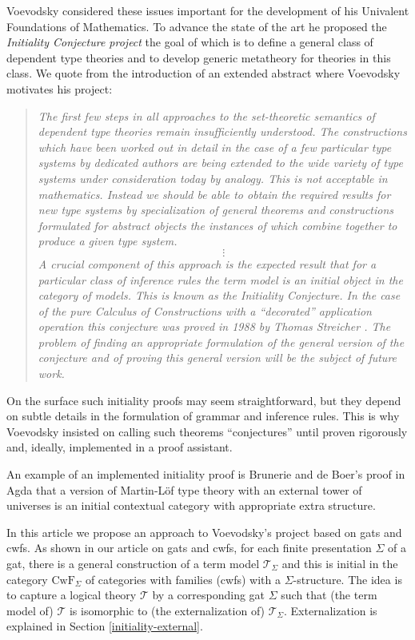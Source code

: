 \documentclass[submission,copyright,creativecommons]{eptcs}
\newcommand{\T}{\mathsf{T}}
\def\T{\mathcal{T}}
\def\CwF{\mathrm{CwF}}
\begin{document}
Voevodsky considered these issues important for the development of his Univalent Foundations of Mathematics. To advance the state
of the art he proposed the {\em Initiality Conjecture project} the goal of which is to define a general class of dependent type theories and to develop generic metatheory for theories in this class. We quote from the introduction of an extended abstract where Voevodsky \cite{voevodsky:initiality} motivates his project:
\begin{quotation}
\emph{The first few steps in all approaches to the set-theoretic semantics of dependent
type theories remain insuﬃciently understood. The constructions which have been
worked out in detail in the case of a few particular type systems by dedicated authors
are being extended to the wide variety of type systems under consideration today by
analogy. This is not acceptable in mathematics. Instead we should be able to obtain
the required results for new type systems by specialization of general theorems and
constructions formulated for abstract objects the instances of which combine together
to produce a given type system.}
$$
\vdots
$$
\emph{A crucial component of this approach is the expected result that for a particular
class of inference rules the term model is an initial object in the category of models.
This is known as the Initiality Conjecture. In the case of the pure Calculus of
Constructions with a “decorated” application operation this conjecture was proved in
1988 by Thomas Streicher \cite{streicher:thesis}. The problem of finding an appropriate formulation
of the general version of the conjecture and of proving this general version will be the
subject of future work.}
\end{quotation}
On the surface such initiality proofs may seem straightforward, but they depend on subtle details in the formulation of grammar and inference rules. This is why Voevodsky insisted on calling such theorems ``conjectures'' until proven rigorously and, ideally, implemented in a proof assistant.

An example of an implemented initiality proof is Brunerie and de Boer's \cite{Brunerie:initiality,deBoer:lic} proof in Agda that a version of Martin-Löf type theory with an external tower of universes is an initial contextual category \cite{cartmell:phd,cartmell:apal} with appropriate extra structure. %

In this article we propose an approach to Voevodsky's project based on gats and cwfs. As shown in our article \cite{bezem:hofmann} on gats and cwfs, for each finite presentation $\Sigma$ of a gat, there is a general construction of a term model $\T_\Sigma$ and this is initial in the category $\CwF_\Sigma$ of categories with families (cwfs) with a $\Sigma$-structure. The idea is to capture a logical theory $\T$ by a corresponding gat $\Sigma$ such that (the term model of) $\T$ is isomorphic to (the externalization of) $\T_\Sigma$. Externalization is explained in Section \ref{initiality-external}.
\end{document}
